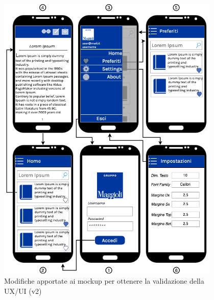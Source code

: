 \begin{figure}[H]
\centering
\includegraphics[width=0.95\textwidth]{img/tesi-23-mockupv2.drawio.png}
\caption{Modifiche apportate ai mockup per ottenere la validazione della UX/UI (v2)}
\end{figure}

